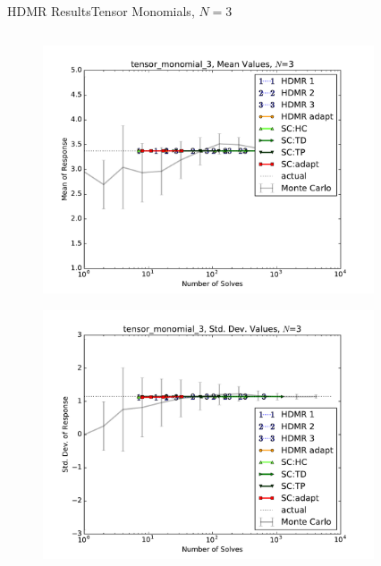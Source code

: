 \documentclass{beamer}
\begin{document}
\begin{frame}{HDMR Results}{Tensor Monomials, $N=3$}\vspace{-20pt}
 \begin{columns}
   \begin{column}{0.5\textwidth}
        \begin{figure}[h!]
          \centering
          \includegraphics[width=0.8\linewidth]{anlmodels/tensor_monomial_3_mean_vals}
        \end{figure}
        \vspace{-20pt}
        \begin{figure}[h!]
          \centering
          \includegraphics[width=0.8\linewidth]{anlmodels/tensor_monomial_3_var_vals}
        \end{figure}
   \end{column}
   \begin{column}{0.5\textwidth}
        \begin{figure}[h!]
          \centering

\end{figure}
\end{column}
\end{columns}
\end{frame}
\end{document}
